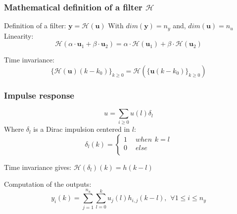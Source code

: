\addtocounter{framenumber}{-1}
\begin{frame}
	\frametitle{Mathematical definition of a filter $\mathcal{H}$}
		Definition of a filter:
		$\boldsymbol{y} = \mathcal{H}(\boldsymbol{u})$
		With $dim(\boldsymbol{y}) = n_y$ and, $dim(\boldsymbol{u}) = n_u$ \\
		Linearity:
		$$ \mathcal{H}(\alpha \cdot \boldsymbol{u}_1+ \beta \cdot \boldsymbol{u}_2)= \alpha\cdot\mathcal{H}(\boldsymbol{u}_1) +  \beta\cdot\mathcal{H}(\boldsymbol{u}_2)$$

		Time invariance:
		$$ \{\mathcal{H}(\boldsymbol{u})(k-k_0)\}_{k\geq0} = \mathcal{H}(\{\boldsymbol{u}(k-k_0)\}_{k \geq 0} ) $$
\end{frame}

\addtocounter{framenumber}{-1}
\begin{frame}
	\frametitle{Impulse response}
	$$u=\sum_{i\geq0}u(l)\delta_l$$
	Where $\delta_l$ is a Dirac impulsion centered in $l$:
	\begin{equation}
		\delta_l(k) =
		\begin{cases}
			1 & \hspace{5pt} when \hspace{5pt} k=l\\
			0 & \hspace{5pt} else\\
		\end{cases}
	\end{equation}

	Time invariance gives: $\mathcal{H}(\delta_l)(k)=h(k-l)$

	Computation of the outputs:
	$$y_i(k)=\sum_{j=1}^{n_u}\sum_{l=0}^ku_j(l)h_{i,j}(k-l), \hspace{5pt} \forall 1 \leq i \leq n_y$$


\end{frame}

